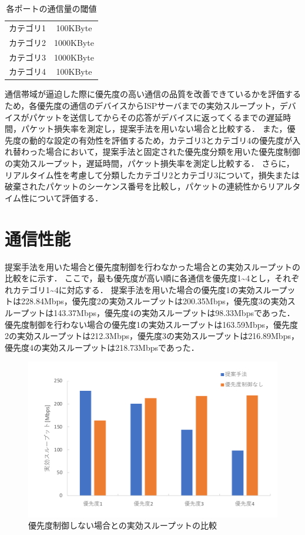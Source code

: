 \documentclass[a4paper,11pt,uplatex]{ujreport}
\begin{document}
  \begin{table}[!tb]
    \caption{各ポートの通信量の閾値}
    \label{tab:threshold}
    \centering
    \begin{tabular}{cc}
      \hline
      カテゴリ1 & 100KByte\\
      カテゴリ2 & 1000KByte\\
      カテゴリ3 & 1000KByte\\
      カテゴリ4 & 100KByte\\
      \hline
    \end{tabular}
  \end{table}

  通信帯域が逼迫した際に優先度の高い通信の品質を改善できているかを評価するため，各優先度の通信のデバイスからISPサーバまでの実効スループット，デバイスがパケットを送信してからその応答がデバイスに返ってくるまでの遅延時間，パケット損失率を測定し，提案手法を用いない場合と比較する．
  また，優先度の動的な設定の有効性を評価するため，カテゴリ3とカテゴリ4の優先度が入れ替わった場合において，提案手法と固定された優先度分類を用いた優先度制御の実効スループット，遅延時間，パケット損失率を測定し比較する．
  さらに，リアルタイム性を考慮して分類したカテゴリ2とカテゴリ3について，損失または破棄されたパケットのシーケンス番号を比較し，パケットの連続性からリアルタイム性について評価する．

\section{通信性能}
\label{sec:通信性能}

  提案手法を用いた場合と優先度制御を行わなかった場合との実効スループットの比較をに示す．
  ここで，最も優先度が高い順に各通信を優先度1\textasciitilde4とし，それぞれカテゴリ1\textasciitilde4に対応する．
  提案手法を用いた場合の優先度1の実効スループットは228.84Mbps，優先度2の実効スループットは200.35Mbps，優先度3の実効スループットは143.37Mbps，優先度4の実効スループットは98.33Mbpsであった．
  優先度制御を行わない場合の優先度1の実効スループットは163.59Mbps，優先度2の実効スループットは212.3Mbps，優先度3の実効スループットは216.89Mbps，優先度4の実効スループットは218.73Mbpsであった．

  \begin{figure}[!b]
    \centering
    \includegraphics[width=0.85\linewidth]{img/throughput_1.pdf}
    \caption{優先度制御しない場合との実効スループットの比較}
    \label{fig:throughput_1}
  \end{figure}
\end{document}

